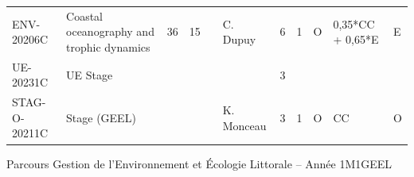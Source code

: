 \documentclass[a4paper,11pt]{article}
\begin{document}
{{\begin{tabular}{lllllllllll}
ENV-20206C    & Coastal oceanography and trophic dynamics                                      & 36 & 15 &    & C. Dupuy        & 6    & 1    & O           & 0,35*CC + 0,65*E & E                \\
\rowcolor[HTML]{C0C0C0} 
UE-20231C     & UE Stage                                                                       &    &    &    &                 & 3    &      &             &                  &                  \\
STAG-O-20211C & Stage (GEEL)                                                                   &    &    &    & K. Monceau      & 3    & 1    & O           & CC               & O                
\end{tabular}}
}{Parcours Gestion de l'Environnement et Écologie Littorale -- Année 1}{M1GEEL}
\end{document}

